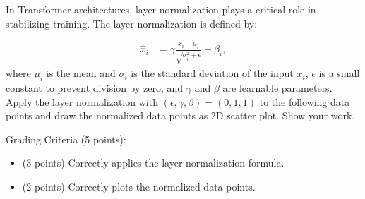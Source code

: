 \documentclass[11pt,addpoints,answers]{exam}
\begin{document}
\begin{questions}
\question[5] In Transformer architectures, layer normalization plays a critical role in stabilizing training. The layer normalization is defined by:

\begin{align*}
  \hat{x}_i &= \gamma \frac{x_i-\mu_i}{\sqrt{\sigma_i^2+\epsilon}} + \beta_i,
\end{align*}
where \(\mu_i\) is the mean and \(\sigma_i\) is the standard deviation of the input \(x_i\), \(\epsilon\) is a small constant to prevent division by zero, and \(\gamma\) and \(\beta\) are learnable parameters.
Apply the layer normalization with $(\epsilon, \gamma, \beta) = (0, 1, 1)$ to the following data points and draw the normalized data points as 2D scatter plot. Show your work.

Grading Criteria (5 points):
\begin{itemize}
  \item (3 points) Correctly applies the layer normalization formula.
  \item (2 points) Correctly plots the normalized data points.
\end{itemize}

\begin{center}
\end{center}

\begin{solution}

\begin{center}
\end{center}


\end{solution}
\end{questions}
\end{document}
